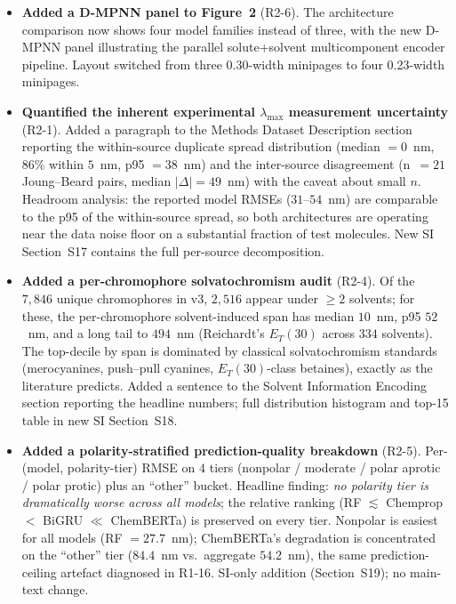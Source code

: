 \documentclass[11pt]{article}
\begin{document}
\begin{itemize}[leftmargin=2em]
  \item \textbf{Added a D-MPNN panel to Figure~2} (R2-6). The architecture comparison now shows four model families instead of three, with the new D-MPNN panel illustrating the parallel solute+solvent multicomponent encoder pipeline. Layout switched from three 0.30-width minipages to four 0.23-width minipages.
  \item \textbf{Quantified the inherent experimental $\lambda_{\max}$ measurement uncertainty} (R2-1). Added a paragraph to the Methods Dataset Description section reporting the within-source duplicate spread distribution (median $= 0$~nm, $86$\% within $5$~nm, p95 $= 38$~nm) and the inter-source disagreement (n~$= 21$ Joung--Beard pairs, median $|\Delta| = 49$~nm) with the caveat about small $n$. Headroom analysis: the reported model RMSEs ($31$--$54$~nm) are comparable to the p95 of the within-source spread, so both architectures are operating near the data noise floor on a substantial fraction of test molecules. New SI Section~S17 contains the full per-source decomposition.
  \item \textbf{Added a per-chromophore solvatochromism audit} (R2-4). Of the $7{,}846$ unique chromophores in v3, $2{,}516$ appear under $\geq 2$ solvents; for these, the per-chromophore solvent-induced span has median $10$~nm, p95 $52$~nm, and a long tail to $494$~nm (Reichardt's $E_T(30)$ across $334$ solvents). The top-decile by span is dominated by classical solvatochromism standards (merocyanines, push--pull cyanines, $E_T(30)$-class betaines), exactly as the literature predicts. Added a sentence to the Solvent Information Encoding section reporting the headline numbers; full distribution histogram and top-15 table in new SI Section~S18.
  \item \textbf{Added a polarity-stratified prediction-quality breakdown} (R2-5). Per-(model, polarity-tier) RMSE on $4$ tiers (nonpolar / moderate / polar aprotic / polar protic) plus an ``other'' bucket. Headline finding: \emph{no polarity tier is dramatically worse across all models}; the relative ranking (RF $\lesssim$ Chemprop $<$ BiGRU $\ll$ ChemBERTa) is preserved on every tier. Nonpolar is easiest for all models (RF $= 27.7$~nm); ChemBERTa's degradation is concentrated on the ``other'' tier ($84.4$~nm vs.\ aggregate $54.2$~nm), the same prediction-ceiling artefact diagnosed in R1-16. SI-only addition (Section~S19); no main-text change.

\end{itemize}
\end{document}
